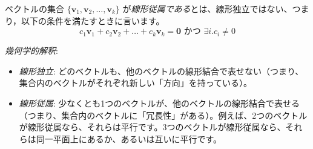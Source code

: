 \begin{dfn}[線形従属] \label{linear_dependence}
ベクトルの集合 $\{\bm{v}_1, \bm{v}_2, \ldots, \bm{v}_k\}$ が\emph{線形従属である}とは、線形独立ではない、つまり，以下の条件を満たすときに言います。
\[c_1 \bm{v}_1 + c_2 \bm{v}_2 + \dots + c_k \bm{v}_k = \bm{0}\text{ かつ }\exists i. c_i\neq0\]
\end{dfn}

\emph{幾何学的解釈}:
\begin{itemize}
\item \emph{線形独立}: どのベクトルも、他のベクトルの線形結合で表せない（つまり、集合内のベクトルがそれぞれ新しい「方向」を持っている）。
\item \emph{線形従属}: 少なくとも1つのベクトルが、他のベクトルの線形結合で表せる（つまり、集合内のベクトルに「冗長性」がある）。例えば、2つのベクトルが線形従属なら、それらは平行です。3つのベクトルが線形従属なら、それらは同一平面上にあるか、あるいは互いに平行です。
\end{itemize}

